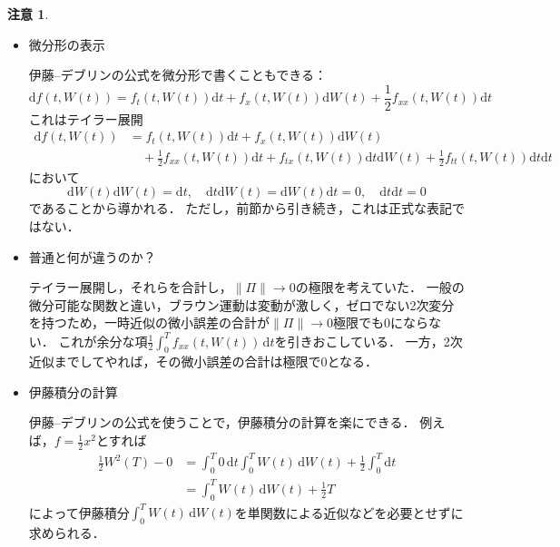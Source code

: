 \documentclass[a4paper, lualatex, ja=standard]{bxjsarticle}
\theoremstyle{definition}
\newtheorem{note}[thm]{注意}
\newcommand{\diff}{\mathrm{d}}
\begin{document}
\begin{note}
  \begin{itemize}
    \item 微分形の表示
    
    伊藤--デブリンの公式を微分形で書くこともできる：
    \setcounter{equation}{12}
    \begin{equation}
      \diff f(t,W(t)) = f_t(t,W(t))\diff t + f_x(t,W(t))\diff W(t) + \frac{1}{2}f_{xx}(t,W(t))\diff t
    \end{equation}
    これはテイラー展開
    \begin{align*}
      \diff f(t,W(t)) &= f_t(t,W(t))\diff t + f_x(t,W(t))\diff W(t) \\
      &\quad+ \frac{1}{2}f_{xx}(t,W(t))\diff t 
      + f_{tx}(t,W(t))\diff t\diff W(t) + \frac{1}{2}f_{tt}(t,W(t))\diff t\diff t
    \end{align*}
    において
    \setcounter{equation}{11}
    \begin{equation}
      \diff W(t)\diff W(t) = \diff t,\quad \diff t\diff W(t) = \diff W(t)\diff t = 0,\quad \diff t\diff t = 0
    \end{equation}
    であることから導かれる．
    ただし，前節から引き続き，これは正式な表記ではない．

    \item 普通と何が違うのか？
    
    テイラー展開し，それらを合計し，$\|\Pi\|\to0$の極限を考えていた．
    一般の微分可能な関数と違い，ブラウン運動は変動が激しく，ゼロでない2次変分を持つため，一時近似の微小誤差の合計が$\|\Pi\|\to0$極限でも$0$にならない．
    これが余分な項$\frac{1}{2}\int_0^T f_{xx}(t,W(t))\,\diff t$を引きおこしている．
    一方，2次近似までしてやれば，その微小誤差の合計は極限で$0$となる．

    \item 伊藤積分の計算
    
    伊藤--デブリンの公式を使うことで，伊藤積分の計算を楽にできる．
    例えば，$f=\frac{1}{2}x^2$とすれば
    \begin{align*}
      \frac{1}{2}W^2(T) - 0 &= \int_0^T 0\,\diff t \int_0^T W(t)\,\diff W(t) + \frac{1}{2}\int_0^T \diff t\\
      &= \int_0^T W(t)\,\diff W(t) + \frac{1}{2}T
    \end{align*}
    によって伊藤積分$\int_0^T W(t)\,\diff W(t)$を単関数による近似などを必要とせずに求められる．
  \end{itemize}
\end{note}
\end{document}
